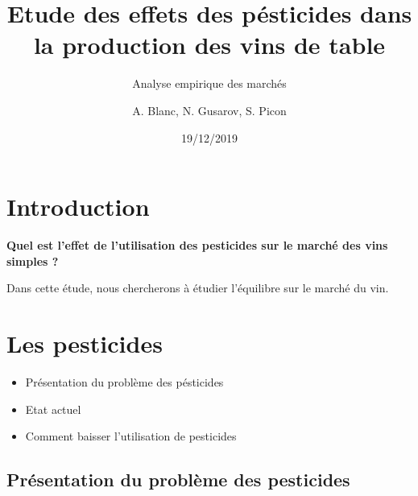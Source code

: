 \documentclass[11pt,]{article}
\title{Etude des effets des pésticides dans la production des vins de table}
\subtitle{Analyse empirique des marchés}
\author{A. Blanc, N. Gusarov, S. Picon}
\date{19/12/2019}
\providecommand{\tightlist}{%
  \setlength{\itemsep}{0pt}\setlength{\parskip}{0pt}}
\begin{document}
\maketitle

\hypertarget{introduction}{%
\section{Introduction}\label{introduction}}

\textbf{Quel est l'effet de l'utilisation des pesticides sur le marché des vins simples ?}

Dans cette étude, nous chercherons à étudier l'équilibre sur le marché
du vin.

\hypertarget{les-pesticides}{%
\section{Les pesticides}\label{les-pesticides}}

\begin{itemize}
\tightlist
\item
  Présentation du problème des pésticides
\item
  Etat actuel
\item
  Comment baisser l'utilisation de pesticides
\end{itemize}

\hypertarget{presentation-du-probleme-des-pesticides}{%
\subsection{Présentation du problème des
pesticides}\label{presentation-du-probleme-des-pesticides}}
\end{document}
